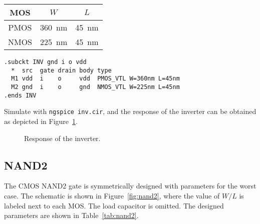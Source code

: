 \documentclass{scrartcl}
\newcommand{\includeres}[1]{\sffamily\scriptsize\vspace{-2em}}
\begin{document}
      \noindent\begin{minipage}[b]{\linewidth}
        \centering
        \begin{minipage}[b]{.45\linewidth}
          \centering
          
          \label{fig:inv}
        \end{minipage}
        \begin{minipage}[b]{.48\linewidth}
          \centering
          \begin{tabular}{ccc}
            \toprule
            MOS & $W$ & $L$ \\\midrule
            PMOS & \qty{360}{nm} & \qty{45}{nm} \\
            NMOS & \qty{225}{nm} & \qty{45}{nm} \\
            \bottomrule
          \end{tabular}
          \label{tab:inv}
        \end{minipage}
      \end{minipage}

      \begin{lstlisting}[title={Inverter Subcircuit}]
.subckt INV gnd i o vdd
  *  src  gate drain body type
  M1 vdd  i    o     vdd  PMOS_VTL W=360nm L=45nm
  M2 gnd  i    o     gnd  NMOS_VTL W=225nm L=45nm
.ends INV
      \end{lstlisting}

      Simulate with \texttt{ngspice inv.cir}, and
      the response of the inverter can be obtained as depicted in Figure~\ref{fig:inv_res}.
      \begin{figure}[htbp]
        \includeres{inv}
        \caption{Response of the inverter.}
        \label{fig:inv_res}
      \end{figure}
      \newpage

    \subsection{NAND2}\label{s:nand2}
      The CMOS NAND2 gate is symmetrically designed with parameters for the worst case.
      The schematic is shown in Figure~\ref{fig:nand2},
      where the value of $W/L$ is labeled next to each MOS.
      The load capacitor is omitted.
      The designed parameters are shown in Table~\ref{tab:nand2}.
\end{document}
